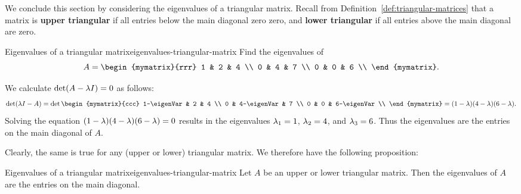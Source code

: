 We conclude this section by considering the eigenvalues of a
triangular matrix. Recall from
Definition~\ref{def:triangular-matrices} that a matrix is
\textbf{upper triangular}%
%
%
%
%
if all entries below the main diagonal zero
zero, and \textbf{lower triangular}%
%
if all entries above the main
diagonal are zero.

\begin{example}{Eigenvalues of a triangular matrix}{eigenvalues-triangular-matrix}
  Find the eigenvalues of
  \begin{equation*}
    A=\begin{mymatrix}{rrr}
      1 & 2 & 4 \\
      0 & 4 & 7 \\
      0 & 0 & 6 \\
    \end{mymatrix}.
  \end{equation*}
\end{example}

\begin{solution}
  We calculate $\det(A - \lambda I) = 0$ as follows:
  \begin{eqnarray*}
    \det (\eigenVar I - A) =
    \det \begin{mymatrix}{ccc}
      1-\eigenVar & 2 & 4 \\
      0 & 4-\eigenVar & 7 \\
      0 & 0 & 6-\eigenVar \\
    \end{mymatrix} = (1-\eigenVar)(4-\eigenVar)(6-\eigenVar).
  \end{eqnarray*}
  Solving the equation $(1-\lambda)(4-\lambda)(6-\lambda) = 0$
  results in the eigenvalues $\lambda_1 = 1$, $\lambda_2 = 4$, and
  $\lambda_3 = 6$.  Thus the eigenvalues are the entries on the main
  diagonal of $A$.
\end{solution}

Clearly, the same is true for any (upper or lower) triangular
matrix. We therefore have the following proposition:

\begin{proposition}{Eigenvalues of a triangular matrix}{eigenvalues-triangular-matrix}
  Let $A$ be an upper or lower triangular matrix. Then the eigenvalues
  of $A$ are the entries on the main diagonal.
\end{proposition}
